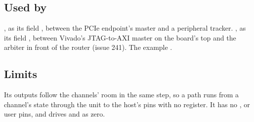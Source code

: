 \subsection*{Used by}

, as its field , between the PCIe endpoint's
master and a peripheral tracker. , as its field
, between Vivado's JTAG-to-AXI master on the board's top
and the arbiter in front of the router (issue 241). The example .

\subsection*{Limits}

Its  outputs follow the channels' room in the same step, so
a path runs from a channel's state through the unit to the host's pins
with no register. It has no ,  or user pins,
and drives  and  as zero.
